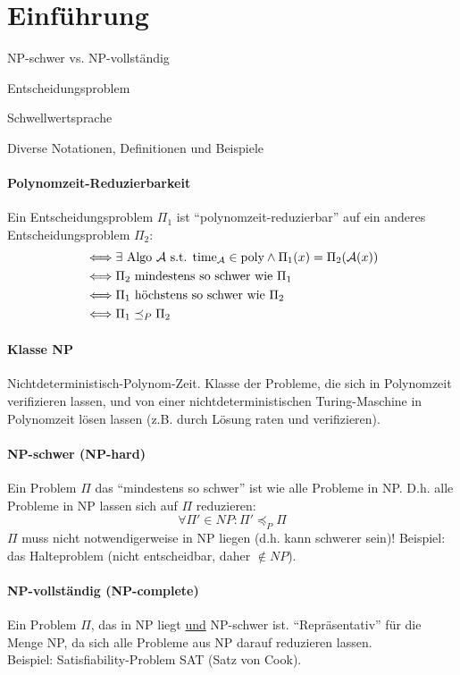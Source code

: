 \section{Einführung}

\begin{takeaway}
    \item NP-schwer vs. NP-vollständig
    \item Entscheidungsproblem
    \item Schwellwertsprache
    \item Diverse Notationen, Definitionen und Beispiele
\end{takeaway}

\paragraph{Polynomzeit-Reduzierbarkeit}
Ein Entscheidungsproblem $\Pi_1$ ist ``polynomzeit-reduzierbar'' auf ein anderes
Entscheidungsproblem $\Pi_2$:
\begin{align*}
& \Longleftrightarrow
\exists \text{ Algo } \mathcal{A} \text{ s.t. } \text{time}_{\mathcal{A}} \in \text{poly}
\wedge \Pi_1(x) = \Pi_2(\mathcal{A}(x))
\\
& \Longleftrightarrow
\Pi_2 \text{ mindestens so schwer wie } \Pi_1
\\
& \Longleftrightarrow
\Pi_1 \text{ höchstens so schwer wie } \Pi_2
\\
& \Longleftrightarrow
\Pi_1 \preceq_P \Pi_2
\end{align*}

\paragraph{Klasse NP}
Nichtdeterministisch-Polynom-Zeit.
Klasse der Probleme, die sich in Polynomzeit verifizieren lassen, und von einer nichtdeterministischen
Turing-Maschine in Polynomzeit lösen lassen (z.B. durch Lösung raten und verifizieren).

\paragraph{NP-schwer (NP-hard)}
Ein Problem $\Pi$ das ``mindestens so schwer'' ist wie alle Probleme in NP.
D.h. alle Probleme in NP lassen sich auf $\Pi$ reduzieren:
$$ \forall \Pi' \in NP : \Pi' \preceq_P \Pi $$
$\Pi$ muss nicht notwendigerweise in NP liegen (d.h. kann schwerer sein)!
Beispiel: das Halteproblem (nicht entscheidbar, daher $\notin NP$).

\paragraph{NP-vollständig (NP-complete)}
Ein Problem $\Pi$, das in NP liegt \underline{und} NP-schwer ist.
``Repräsentativ'' für die Menge NP, da sich alle Probleme aus NP darauf reduzieren lassen. \\
Beispiel: Satisfiability-Problem SAT (Satz von Cook).

